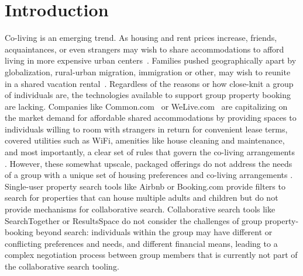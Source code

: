 \section{Introduction}

Co-living is an emerging trend. As housing and rent prices increase, friends, acquaintances, or even strangers may wish to share accommodations to afford living in more expensive urban centers~\cite{colivingthinkthank}. Families pushed geographically apart by globalization, rural-urban migration, immigration or other, may wish to reunite in a shared vacation rental~\cite{vrbo}. Regardless of the reasons or how close-knit a group of individuals are, the technologies available to support group property booking are lacking. Companies like Common.com~\cite{common} or WeLive.com~\cite{welive} are capitalizing on the market demand for affordable shared accommodations by providing spaces to individuals willing to room with strangers in return for convenient lease terms, covered utilities such as WiFi, amenities like house cleaning and maintenance, and most importantly, a clear set of rules that govern the co-living arrangements \cite{colivinginvestment}. However, these somewhat upscale, packaged offerings do not address the needs of a group with a unique set of housing preferences and co-living arrangements \cite{problemswithcoliving}. Single-user property search tools like Airbnb \cite{airbnb} or Booking.com \cite{booking} provide filters to search for properties that can house multiple adults and children but do not provide mechanisms for collaborative search. Collaborative search tools like 
SearchTogether \cite{searchtogether} or ResultsSpace \cite{resultsspace} do not consider the challenges of group property-booking beyond search: individuals within the group may have different or conflicting preferences and needs, and different financial means, leading to a complex negotiation process between group members that is currently not part of the collaborative search tooling.  


